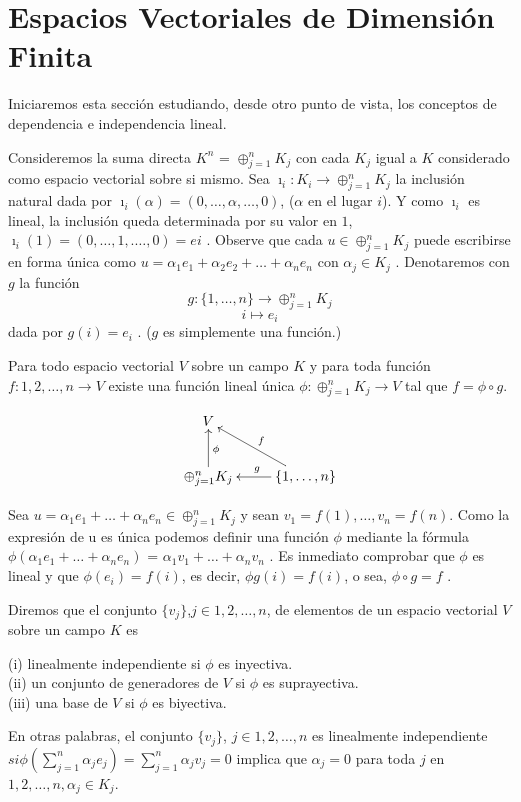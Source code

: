     		 \section{Espacios Vectoriales de Dimensión Finita}
    		 Iniciaremos esta sección estudiando, desde otro punto de vista, los conceptos de dependencia e independencia lineal. 
    		 
    		 Consideremos la suma directa $ K^{n} $ = $ \oplus^{n}_{j=1} K_{j} $ con cada $ K_{j} $ igual a $ K $ considerado como espacio vectorial sobre si mismo. Sea $ \imath_{i}: K_{i} \rightarrow \oplus^{n}_{j=1} K_{j} $ la inclusión natural dada por $ \imath_{i} (\alpha) = (0, \ldots , \alpha, \ldots , 0) $, ($\alpha$ en el lugar $ i $). Y como $\imath_{i}$
    		 es lineal, la inclusión queda determinada por su valor en $ 1 $, $ \imath_{i}(1) = (0, \ldots , 1, .\ldots , 0) = ei $ . Observe que cada $ u \in \oplus^{n}_{j=1} K_{j} $ puede escribirse en forma única como $ u =\alpha_{1} e_{1} + \alpha_{2}e_{2} + \ldots + \alpha_{n} e_{n} $  con $ \alpha_{j} \in K_{j} $ . Denotaremos con $ g $ la función
    		 \[ g:\{1, \ldots, n\} \rightarrow \oplus^{n}_{j=1} K_{j} \]
    		 \[ i \mapsto e_{i} \]
    		 dada por $ g(i) = e_{i} $ . ($ g $ es simplemente una función.)
    		  
    		  \begin{pro}
    		  	Para todo espacio vectorial $ V $ sobre un campo $ K $ y para toda función $ f : {1, 2, \ldots , n} \rightarrow V $ existe una función lineal única $ \phi: \oplus^{n}_{j=1} K_{j} \rightarrow V $ tal que $ f = \phi \circ g $.
    		  \end{pro}
    	 \[  \xymatrix{%
    	 V & \\
    	 \oplus^{n}_{j=1} K_{j} \ar[u]_{\phi} & \{1, \ldots, n\} \ar[lu]_{f} \ar[l]_{g}
     } \]
 
 		\begin{demo}
 			Sea $ u =\alpha_{1} e_{1} + \ldots + \alpha_{n} e_{n} \in \oplus^{n}_{j=1} K_{j} $ y sean $ v_{1} = f (1), \ldots , v_{n} = f (n) $. Como la expresión de u es única podemos definir una función $\phi$ mediante la fórmula $ \phi(\alpha_{1} e_{1} + \ldots +\alpha_{n} e_{n} ) $ = $ \alpha_{1} v_{1} + \ldots + \alpha_{n} v_{n} $ . Es inmediato comprobar que $\phi$ es lineal y que $ \phi(e_{i}) = f(i) $, es decir, $ \phi g(i) = f(i) $, o sea, $ \phi \circ g = f $ .
 		\end{demo}
 		\begin{defi}
 			Diremos que el conjunto $ \{v_{j} \} $,$  j \in {1, 2, \ldots , n} $, de elementos de un espacio vectorial $ V $ sobre un campo $ K $ es
 			
 			(i) linealmente independiente si $\phi$ es inyectiva. \\
 			(ii) un conjunto de generadores de $ V $ si $\phi$ es suprayectiva.\\
 			(iii) una base de $ V $ si $\phi$ es biyectiva.
 		\end{defi}
 			En otras palabras, el conjunto $ \{v_{j} \} $, $ j \in {1, 2, \ldots, n} $ es linealmente independiente $ si \phi(\sum_{j=1}^{n} \alpha_{j} e_{j} ) = \sum_{j=1}^{n} \alpha_{j} v_{j} = 0 $ implica que $ \alpha_{j} = 0 $ para toda $ j $ en $ {1, 2, \ldots , n}, \alpha_{j} \in K_{j}  $.
 			
